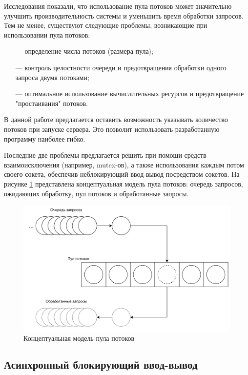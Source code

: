Исследования \cite{thread-pool} показали, что использование пула потоков может значительно улучшить производительность системы и уменьшить время обработки запросов. Тем не менее, существуют следующие проблемы, возникающие при использовании пула потоков:

\begin{itemize}[leftmargin=1.6\parindent]
	\item[---] определение числа потоков (размера пула);
	\item[---] контроль целостности очереди и предотвращения обработки одного запроса двумя потоками;
	\item[---] оптимальное использование вычислительных ресурсов и предотвращение "простаивания" потоков.
\end{itemize}

В данной работе предлагается оставить возможность указывать количество потоков при запуске сервера. Это позволит использовать разработанную программу наиболее гибко. 

Последние две проблемы предлагается решить при помощи средств взаимоисключения (например, mutex-ов), а также использования каждым потом своего сокета, обеспечив неблокирующий ввод-вывод посредством сокетов.
На рисунке \ref{fig:threadpool} представлена концептуальная модель пула потоков: очередь запросов, ожидающих обработку, пул потоков и обработанные запросы.

\begin{figure}[h!]
	\centering
	\captionsetup{justification=centering}
	\includegraphics[width=150mm]{img/threadpool.png}
	\caption{Концептуальная модель пула потоков}
	\label{fig:threadpool}
\end{figure}

\subsection{Асинхронный блокирующий ввод-вывод}

